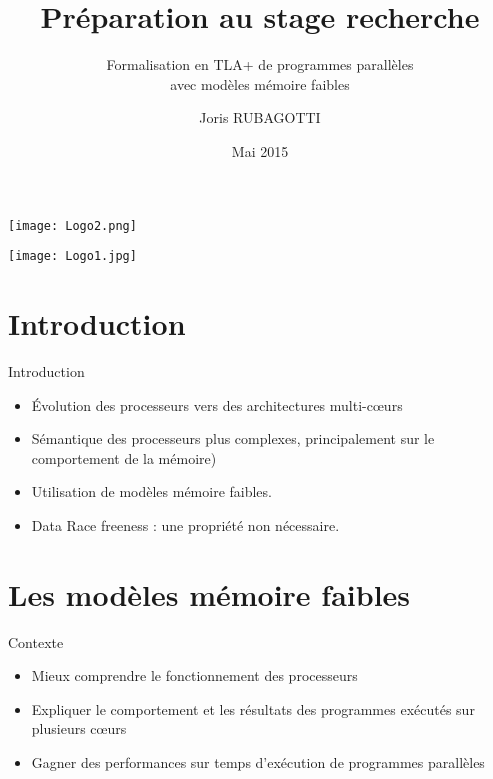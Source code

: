 \documentclass{beamer}
\title{Préparation au stage recherche}
\subtitle{Formalisation en TLA+ de programmes parallèles \\avec modèles mémoire faibles}
\author{Joris RUBAGOTTI}
\date{Mai 2015}
\begin{document}
\begin{frame}

\begin{minipage}[c]{.46\linewidth}
     \begin{center}
             \texttt{[image: Logo2.png]}
         \end{center}
   \end{minipage} \hfill
   \begin{minipage}[c]{.46\linewidth}
    \begin{center}
            \texttt{[image: Logo1.jpg]}
        \end{center}
 \end{minipage}

\maketitle

\end{frame}

\section{Introduction}
\begin{frame}{Introduction}
	\begin{itemize}
    	\item Évolution des processeurs vers des architectures multi-cœurs
    	\item Sémantique des processeurs plus complexes, principalement sur le comportement de la mémoire)
    	\item Utilisation de modèles mémoire faibles.
    	\item Data Race freeness : une propriété non nécessaire.
    \end{itemize}
\end{frame}

\section{Les modèles mémoire faibles}
\begin{frame}{Contexte}
	\begin{itemize}
	\item Mieux comprendre le fonctionnement des processeurs
	\item Expliquer le comportement et les résultats des programmes exécutés sur plusieurs cœurs
	\item Gagner des performances sur temps d'exécution de programmes parallèles
	\end{itemize}
\end{frame}
\end{document}
